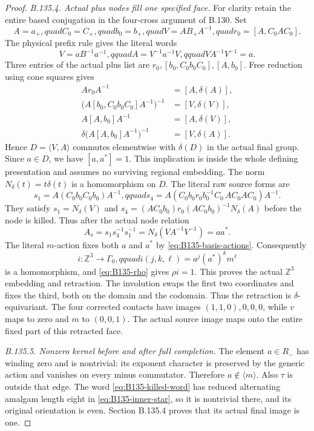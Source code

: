 \begin{proof}
\emph{B.135.4. Actual plus nodes fill one specified face.}
For clarity retain the entire based conjugation in the
four-cross argument of B.130. Set
\[
 A=a_+,quad C_0=C_+,quad b_0=b_+,quad
 V=AB_+A^{-1},quad r_0=[A,C_0AC_0].
\]
The physical prefix rule gives the literal words
\[
 V=aB^{-1}a^{-1},qquad A=V^{-1}a^{-1}V,qquad
 VA^{-1}V^{-1}=a.
\]
Three entries of the actual plus list are
$r_0,[b_0,C_0b_0C_0],[A,b_0]$. Free reduction using cone
squares gives
\begin{equation}\label{eq:B135-four-cross}
 \begin{aligned}
 Ar_0A^{-1}&=[A,\delta(A)],\\
 \bigl(A[b_0,C_0b_0C_0]A^{-1}\bigr)^{-1}
      &=[V,\delta(V)],\\
 A[A,b_0]A^{-1}&=[A,\delta(V)],\\
 \delta\bigl(A[A,b_0]A^{-1}\bigr)^{-1}
      &=[V,\delta(A)].
 \end{aligned}
\end{equation}
Hence $D=\langle V,A\rangle$ commutes elementwise with
$\delta(D)$ in the actual final group. Since $a\in D$,
we have $[a,a^*]=1$. This implication is inside the whole
defining presentation and assumes no surviving regional
embedding. The norm $N_\delta(t)=t\delta(t)$ is a
homomorphism on $D$. The literal raw source forms are
\[
 s_1=A(C_0b_0C_0b_0)A^{-1},qquad
 s_4=A(C_0b_0r_0b_0^{-1}C_0\,AC_0AC_0)A^{-1}.
\]
They satisfy $s_1=N_\delta(V)$ and
$s_4=(AC_0b_0)r_0(AC_0b_0)^{-1}N_\delta(A)$ before
the node is killed. Thus after the actual node relation
\[
 A_s=s_1s_4^{-1}s_1^{-1}
    =N_\delta(VA^{-1}V^{-1})=aa^*.
\]
The literal $m$-action fixes both $a$ and $a^*$ by
\eqref{eq:B135-basis-actions}. Consequently
\[
 i:\mathbb Z^3\longrightarrow\Gamma_0,qquad
 i(j,k,\ell)=a^j(a^*)^k m^\ell
\]
is a homomorphism, and \eqref{eq:B135-rho} gives $\rho i=1$.
This proves the actual $\mathbb Z^3$ embedding and retraction.
The involution swaps the first two coordinates and fixes the
third, both on the domain and the codomain. Thus the retraction
is $\delta$-equivariant. The four corrected contacts have
images $(1,1,0),0,0,0$, while $v$ maps to zero and $m$ to
$(0,0,1)$. The actual source image maps onto the entire fixed
part of this retracted face.

\emph{B.135.5. Nonzero kernel before and after full completion.}
The element $a\in R_-$ has winding zero and is nontrivial:
its exponent character is preserved by the generic action
and vanishes on every minus commutator. Therefore
$a\notin\langle m\rangle$. Also $\tau$ is outside that
edge. The word \eqref{eq:B135-killed-word} has reduced
alternating amalgam length eight in \eqref{eq:B135-inner-star},
so it is nontrivial there, and its original orientation is even.
Section B.135.4 proves that its actual final image is one.


\end{proof}
